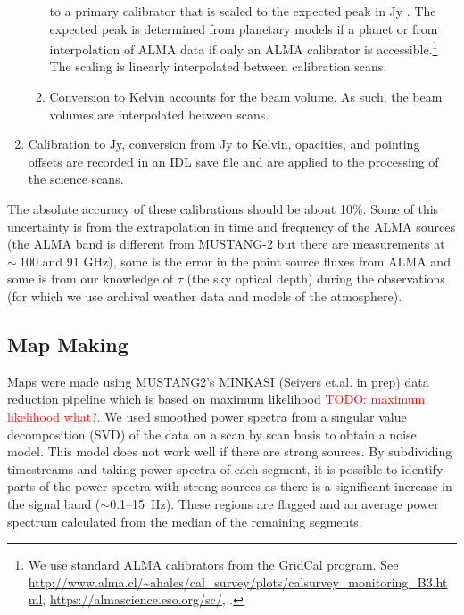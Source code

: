 \documentclass[twocolumn]{aastex62}
\def\todo#1{{\textcolor{red}{TODO: #1}}}
\newcommand{\MUSTANG}{MUSTANG-2\xspace}
\begin{document}
\begin{enumerate}
\begin{enumerate}
                to a primary calibrator that is scaled to the expected
                peak in Jy \perbeam.  The expected peak is determined from
                planetary models if a planet or from interpolation of ALMA data
                if only an ALMA calibrator is accessible.\footnote{We use standard ALMA calibrators from the GridCal program.  See \url{http://www.alma.cl/~ahales/cal_survey/plots/calsurvey_monitoring_B3.html}, \url{https://almascience.eso.org/sc/}, \cite{vanKempen2014}.} The scaling is
                linearly interpolated between calibration scans.
            \item Conversion to Kelvin accounts for the beam volume. As such,
                the beam volumes are interpolated between scans.
        \end{enumerate}
    \item Calibration to Jy, conversion from Jy \perbeam to Kelvin, opacities,
        and pointing offsets are recorded in an IDL save file and are
        applied to the processing of the science scans.
\end{enumerate}

The absolute accuracy of these calibrations should be about 10\%.
Some of this uncertainty is from the extrapolation in time and frequency of the ALMA
sources (the ALMA band is different from \MUSTANG but there are measurements at
$\sim~100$ and 91 GHz), some is the error in the point source fluxes from ALMA and
some is from our knowledge of $\tau$ (the sky optical depth) during the observations (for which we use archival weather data and models of the atmosphere). 

\subsection{Map Making}
Maps were made using MUSTANG2's MINKASI (Seivers et.al. in prep) data reduction
pipeline which is based on maximum likelihood \todo{maximum likelihood what?}.
We used smoothed power spectra from a singular value decomposition (SVD) of the
data on a scan by scan basis to obtain a noise model.
This model does not work well if there are strong sources.
By subdividing timestreams and taking power spectra of each segment, it is
possible to identify parts of the power spectra with strong sources as there is
a significant increase in the signal band ($\sim$0.1--15~Hz). These regions are
flagged and an average power spectrum calculated from the median of the
remaining segments. 
\end{document}
